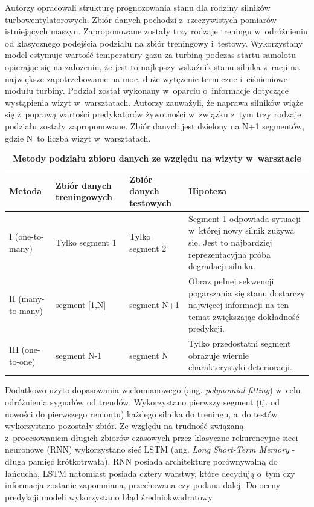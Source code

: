 Autorzy \cite{framework_ml_health} opracowali strukturę prognozowania stanu dla rodziny silników turbowentylatorowych. Zbiór danych pochodzi z~rzeczywistych pomiarów istniejących maszyn. Zaproponowane zostały trzy rodzaje treningu w~odróżnieniu od klasycznego podejścia podziału na zbiór treningowy i~testowy. Wykorzystany model estymuje wartość temperatury gazu za turbiną podczas startu samolotu opierając się na założeniu, że jest to najlepszy wskaźnik stanu silnika z~racji na największe zapotrzebowanie na moc, duże wytężenie termiczne i~ciśnieniowe modułu turbiny. Podział został wykonany w~oparciu o~informacje dotyczące wystąpienia wizyt w~warsztatach. Autorzy zauważyli, że naprawa silników wiąże się z~poprawą wartości predykatorów żywotności w~związku z~tym trzy rodzaje podziału zostały zaproponowane. Zbiór danych jest dzielony na N+1 segmentów, gdzie N~to liczba wizyt w~warsztatach.
\begin{table}[H]
\centering
\caption{\textbf{Metody podziału zbioru danych ze względu na wizyty w~warsztacie}}
\label{tab:metody_podzialu}
\begin{tabular}{p{2.5cm} p{3cm} p{3cm} p{7cm}}
\hline
\textbf{Metoda} & \textbf{Zbiór danych treningowych} & \textbf{Zbiór danych testowych} & \textbf{Hipoteza} \\
\hline
I (one-to-many) 
& Tylko segment 1 
& Tylko segment 2 
& Segment 1 odpowiada sytuacji w~której nowy silnik zużywa się. Jest to najbardziej reprezentacyjna próba degradacji silnika. \\
\hline
II (many-to-many) 
& segment [1,N] 
& segment N+1
& Obraz pełnej sekwencji pogarszania się stanu dostarczy najwięcej informacji na ten temat zwiększając dokładność predykcji.\\
\hline
III (one-to-one) 
& segment N-1 
& segment N
& Tylko przedostatni segment obrazuje wiernie charakterystyki deterioracji.\\
\hline
\end{tabular}
\end{table}

Dodatkowo użyto dopasowania wielomianowego (ang. \textit{polynomial fitting}) w~celu odróżnienia sygnałów od trendów. Wykorzystano pierwszy segment (tj. od nowości do pierwszego remontu) każdego silnika do treningu, a~do testów wykorzystano pozostały zbiór. Ze względu na trudność związaną z~procesowaniem długich zbiorów czasowych przez klasyczne rekurencyjne sieci neuronowe (RNN) wykorzystano sieć LSTM (ang. \textit{Long Short-Term Memory} - długa pamięć krótkotrwała). RNN posiada architekturę porównywalną do łańcucha, LSTM natomiast posiada cztery warstwy, które decydują o~tym czy informacja zostanie zapomniana, przechowana czy podana dalej. 
Do oceny predykcji modeli wykorzystano błąd średniokwadratowy

